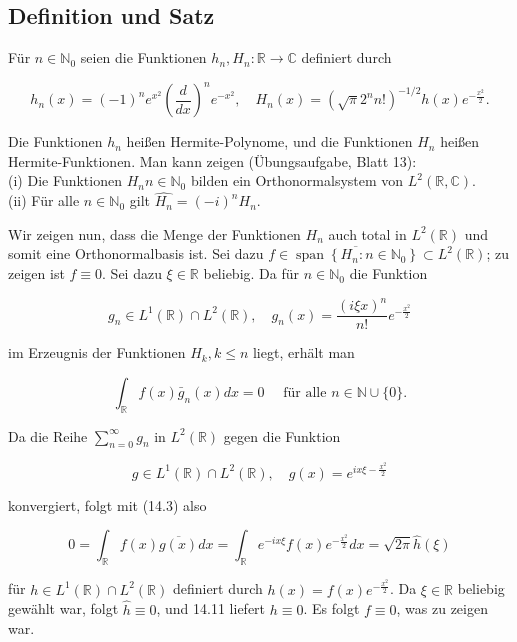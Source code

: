 \documentclass[10pt, letterpaper]{article}
\begin{document}
\subsection*{Definition und Satz}
Für $n \in \mathbb{N}_{0}$ seien die Funktionen $h_{n}, H_{n}: \mathbb{R} \rightarrow \mathbb{C}$ definiert durch

$$
h_{n}(x)=(-1)^{n} e^{x^{2}}\left(\frac{d}{d x}\right)^{n} e^{-x^{2}}, \quad H_{n}(x)=\left(\sqrt{\pi} 2^{n} n!\right)^{-1 / 2} h(x) e^{-\frac{x^{2}}{2}} .
$$

Die Funktionen $h_{n}$ heißen Hermite-Polynome, und die Funktionen $H_{n}$ heißen Hermite-Funktionen. Man kann zeigen (Übungsaufgabe, Blatt 13):\\
(i) Die Funktionen $H_{n} n \in \mathbb{N}_{0}$ bilden ein Orthonormalsystem von $L^{2}(\mathbb{R}, \mathbb{C})$.\\
(ii) Für alle $n \in \mathbb{N}_{0}$ gilt $\widehat{H_{n}}=(-i)^{n} H_{n}$.

Wir zeigen nun, dass die Menge der Funktionen $H_{n}$ auch total in $L^{2}(\mathbb{R})$ und somit eine Orthonormalbasis ist. Sei dazu $f \in \overline{\operatorname{span}\left\{H_{n}: n \in \mathbb{N}_{0}\right\}} \subset L^{2}(\mathbb{R})$; zu zeigen ist $f \equiv 0$. Sei dazu $\xi \in \mathbb{R}$ beliebig. Da für $n \in \mathbb{N}_{0}$ die Funktion

$$
g_{n} \in L^{1}(\mathbb{R}) \cap L^{2}(\mathbb{R}), \quad g_{n}(x)=\frac{(i \xi x)^{n}}{n!} e^{-\frac{x^{2}}{2}}
$$

im Erzeugnis der Funktionen $H_{k}, k \leq n$ liegt, erhält man

$$
\int_{\mathbb{R}} f(x) \bar{g}_{n}(x) d x=0 \quad \text { für alle } n \in \mathbb{N} \cup\{0\} .
$$

Da die Reihe $\sum_{n=0}^{\infty} g_{n}$ in $L^{2}(\mathbb{R})$ gegen die Funktion

$$
g \in L^{1}(\mathbb{R}) \cap L^{2}(\mathbb{R}), \quad g(x)=e^{i x \xi-\frac{x^{2}}{2}}
$$

konvergiert, folgt mit (14.3) also

$$
0=\int_{\mathbb{R}} f(x) \overline{g(x)} d x=\int_{\mathbb{R}} e^{-i x \xi} f(x) e^{-\frac{x^{2}}{2}} d x=\sqrt{2 \pi} \hat{h}(\xi)
$$

für $h \in L^{1}(\mathbb{R}) \cap L^{2}(\mathbb{R})$ definiert durch $h(x)=f(x) e^{-\frac{x^{2}}{2}}$. Da $\xi \in \mathbb{R}$ beliebig gewählt war, folgt $\hat{h} \equiv 0$, und 14.11 liefert $h \equiv 0$. Es folgt $f \equiv 0$, was zu zeigen war.
\end{document}
